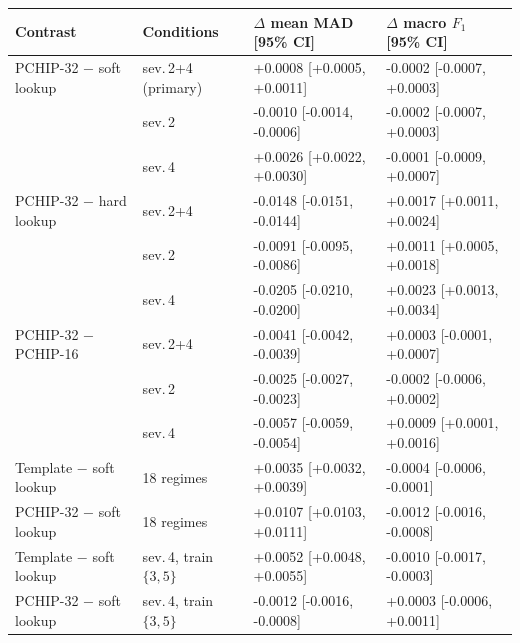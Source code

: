 \begin{tabular}{llll}
\toprule
Contrast & Conditions & $\Delta$ mean MAD [95\% CI] & $\Delta$ macro $F_1$ [95\% CI] \\
\midrule
PCHIP-32 $-$ soft lookup & sev.\,2+4 (primary) & +0.0008 [+0.0005, +0.0011] & -0.0002 [-0.0007, +0.0003] \\
 & sev.\,2 & -0.0010 [-0.0014, -0.0006] & -0.0002 [-0.0007, +0.0003] \\
 & sev.\,4 & +0.0026 [+0.0022, +0.0030] & -0.0001 [-0.0009, +0.0007] \\
PCHIP-32 $-$ hard lookup & sev.\,2+4 & -0.0148 [-0.0151, -0.0144] & +0.0017 [+0.0011, +0.0024] \\
 & sev.\,2 & -0.0091 [-0.0095, -0.0086] & +0.0011 [+0.0005, +0.0018] \\
 & sev.\,4 & -0.0205 [-0.0210, -0.0200] & +0.0023 [+0.0013, +0.0034] \\
PCHIP-32 $-$ PCHIP-16 & sev.\,2+4 & -0.0041 [-0.0042, -0.0039] & +0.0003 [-0.0001, +0.0007] \\
 & sev.\,2 & -0.0025 [-0.0027, -0.0023] & -0.0002 [-0.0006, +0.0002] \\
 & sev.\,4 & -0.0057 [-0.0059, -0.0054] & +0.0009 [+0.0001, +0.0016] \\
Template $-$ soft lookup & 18 regimes & +0.0035 [+0.0032, +0.0039] & -0.0004 [-0.0006, -0.0001] \\
PCHIP-32 $-$ soft lookup & 18 regimes & +0.0107 [+0.0103, +0.0111] & -0.0012 [-0.0016, -0.0008] \\
Template $-$ soft lookup & sev.\,4, train $\{3,5\}$ & +0.0052 [+0.0048, +0.0055] & -0.0010 [-0.0017, -0.0003] \\
PCHIP-32 $-$ soft lookup & sev.\,4, train $\{3,5\}$ & -0.0012 [-0.0016, -0.0008] & +0.0003 [-0.0006, +0.0011] \\
\bottomrule
\end{tabular}
